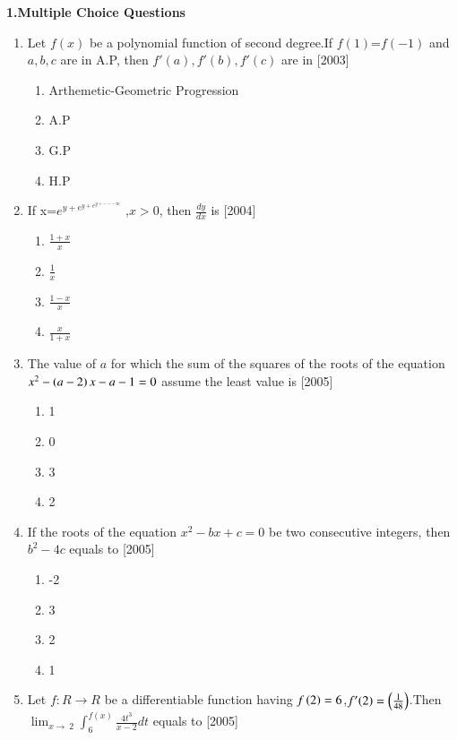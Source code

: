 \documentclass[journal,12pt,twocolumn]{IEEEtran}
\theoremstyle{remark}
\begin{document}
\maketitle \textbf{1.Multiple Choice Questions}
\begin{enumerate}
    \item Let $f(x)$ be a polynomial function of second degree.If $f(1)$=$f(-1)$ and $a,b,c$ are in A.P, then $f'(a),f'(b),f'(c)$ are in
    \hfill[2003]\break
    \begin{enumerate}
    \item Arthemetic-Geometric Progression
    \item A.P
    \item G.P
    \item H.P\\
    
    \end{enumerate}
    \item If x=$e^{y+e^{y+e^{y+---\infty}}}$ ,$x>0$, then $\frac{dy}{dx}$ is
    \hfill[2004]\break
    \begin{multicols}{4}
    \begin{enumerate}
    \item $\frac{1+x}{x}$
    \item $\frac{1}{x}$
    \item $\frac{1-x}{x}$
    \item $\frac{x}{1+x}$
\end{enumerate}
\end{multicols}
\item The value of $a$ for which the sum of the squares of the roots of the equation $x^2-\left(a-2\right)x-a-1=0$ assume the least value is
\hfill[2005]\break
\begin{multicols}{4}
\begin{enumerate}
    \item 1
    \item 0
    \item 3
    \item 2
    \end{enumerate}
    \end{multicols}
    \item If the roots of the equation $x^2-bx+c=0$ be   two  consecutive integers, then $b^2-4c$  equals  to
    \hfill[2005]\break
    \begin{multicols}{4}
    \begin{enumerate}
        \item -2
        \item 3
        \item 2
        \item 1
    \end{enumerate}
    \end{multicols}
    \item Let $f:R\rightarrow R$ be a differentiable function having $f\left(2\right)=6$,$f'(2)=\left(\frac{1}{48}\right)$.Then $\lim_{x\to\ 2} \int_{6}^{f(x)} \frac{4t^3}{x-2} dt$ equals to
    \hfill[2005]\break
    \begin{multicols}{4}
        

\end{multicols}
\end{enumerate}
\end{document}
